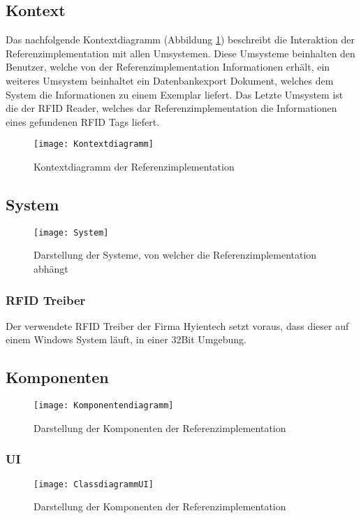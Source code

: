 \subsection{Kontext}

Das nachfolgende Kontextdiagramm (Abbildung \ref{fig:Kontextdiagramm}) beschreibt die Interaktion der Referenzimplementation mit allen Umsystemen. Diese Umsysteme beinhalten den Benutzer, welche von der Referenzimplementation Informationen erhält, ein weiteres Umsystem beinhaltet ein Datenbankexport Dokument, welches dem System die Informationen zu einem Exemplar liefert. Das Letzte Umsystem ist die der RFID Reader, welches dar Referenzimplementation die Informationen eines gefundenen RFID Tags liefert.
\begin{figure}[htb]
	\centering
	\texttt{[image: Kontextdiagramm]}
	\caption{Kontextdiagramm der Referenzimplementation}
	\label{fig:Kontextdiagramm}
\end{figure}

\subsection{System}
\begin{figure}[htb]
	\centering
	\texttt{[image: System]}
	\caption{Darstellung der Systeme, von welcher die Referenzimplementation abhängt}
	\label{fig:System}
\end{figure}
\subsubsection{RFID Treiber}
Der verwendete RFID Treiber der Firma Hyientech setzt voraus, dass dieser auf einem Windows System läuft, in einer 32Bit Umgebung.

\subsection{Komponenten}
\begin{figure}[htb]
	\centering
	\texttt{[image: Komponentendiagramm]}
	\caption{Darstellung der Komponenten der Referenzimplementation}
	\label{fig:Components}
\end{figure}

\subsubsection{UI}
\begin{figure}[htb]
	\centering
	\texttt{[image: ClassdiagrammUI]}
	\caption{Darstellung der Komponenten der Referenzimplementation}
	\label{fig:KlassUI}
\end{figure}

